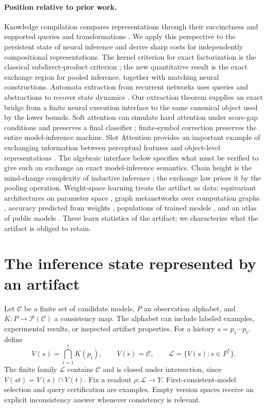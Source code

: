 \documentclass{article}
\theoremstyle{definition}
\newcommand{\C}{\mathcal C}
\newcommand{\Latt}{\mathcal L}
\newcommand{\powerset}{\mathcal P}
\begin{document}
\paragraph{Position relative to prior work.}
Knowledge compilation compares representations through their succinctness and supported queries and transformations \citep{darwiche2002map}. We apply this perspective to the persistent state of neural inference and derive sharp costs for independently compositional representations. The kernel criterion for exact factorization is the classical subdirect-product criterion \citep{birkhoff1944}; the new quantitative result is the exact exchange region for pooled inference, together with matching neural constructions. Automata extraction from recurrent networks uses queries and abstractions to recover state dynamics \citep{weiss2018extracting}. Our extraction theorem supplies an exact bridge from a finite neural execution interface to the same canonical object used by the lower bounds. Soft attention can simulate hard attention under score-gap conditions and preserves a final classifier \citep{yang2026soft}; finite-symbol correction preserves the entire model-inference machine. Slot Attention provides an important example of exchanging information between perceptual features and object-level representations \citep{locatello2020slot}. The algebraic interface below specifies what must be verified to give such an exchange an exact model-inference semantics. Chain height is the mind-change complexity of inductive inference \citep{gold1967,casesmith1983}; the exchange law prices it by the pooling operation. Weight-space learning treats the artifact as data: equivariant architectures on parameter space \citep{navon2023equivariant}, graph metanetworks over computation graphs \citep{lim2024graph,kofinas2024graph}, accuracy predicted from weights \citep{unterthiner2020predicting}, populations of trained models \citep{schurholt2022modelzoos}, and an atlas of public models \citep{horwitz2025atlas}. These learn statistics of the artifact; we characterize what the artifact is obliged to retain.

\section{The inference state represented by an artifact}\label{sec:inference}
Let $\C$ be a finite set of candidate models, $P$ an observation alphabet, and $K:P\to\powerset(\C)$ a consistency map. The alphabet can include labeled examples, experimental results, or inspected artifact properties. For a history $s=p_1\cdots p_t$, define
\begin{equation}
 V(s)=\bigcap_{i=1}^tK(p_i),\qquad V(\epsilon)=\C,
 \qquad \Latt=\{V(s):s\in P^*\}.
 \label{eq:version}
\end{equation}
The finite family $\Latt$ contains $\C$ and is closed under intersection, since $V(st)=V(s)\cap V(t)$. Fix a readout $\rho:\Latt\to Y$. First-consistent-model selection and query certification are examples. Empty version spaces receive an explicit inconsistency answer whenever consistency is relevant.
\end{document}
